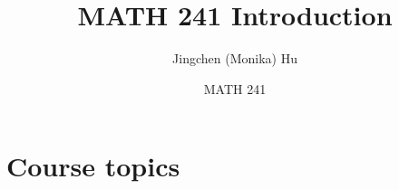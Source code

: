 \documentclass[slidestop,compress,mathserif]{beamer}
\title[MATH 241 Introduction]{MATH 241 Introduction}
\author[Jingchen (Monika) Hu] %
{Jingchen (Monika) Hu}
\institute[Vassar] %
{Vassar College}
\date[MATH 241] %
{MATH 241}
\begin{document}



\addtocounter{framenumber}{-1}





\section{Course topics}

\end{document}
